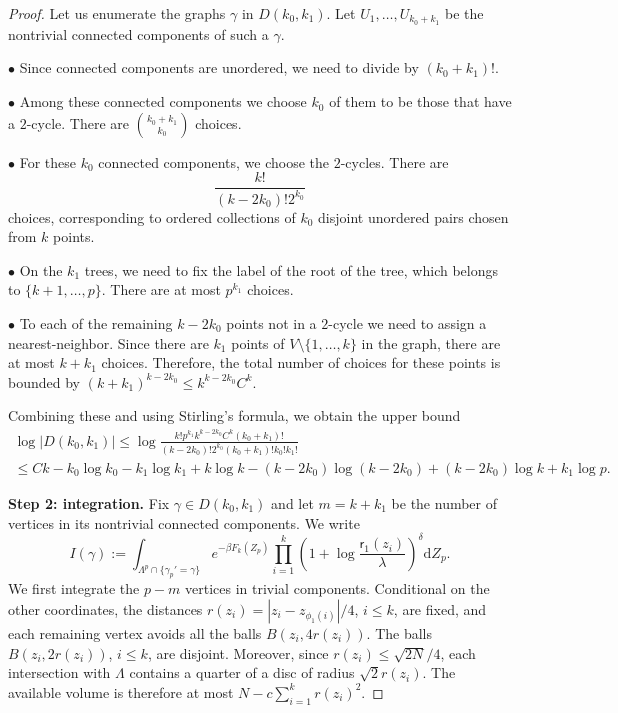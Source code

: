 \documentclass[a4paper,10pt,leqno]{amsart}
\numberwithin{equation}{section}
\newcommand{\dd}{\mathrm{d}}
\def\rr{\mathsf{r}}
\begin{document}
\begin{proof}
  Let us enumerate the graphs $\gamma$ in $D(k_0,k_1)$. Let $U_1,\ldots,U_{k_0+k_1}$ be the nontrivial connected components of such a $\gamma$.

  $\bullet $ Since connected components are unordered, we need to divide by $(k_0+k_1)!$.

  $\bullet$ Among these connected components we choose $k_0$ of them to be those that have a $2$-cycle. There are $\binom{k_0+k_1}{k_0}$ choices.

  $\bullet$ For these $k_0$ connected components, we choose the
  $2$-cycles. There are
  \begin{equation*}
    \frac{k!}{(k-2k_0)!2^{k_0}}
  \end{equation*}
  choices, corresponding to ordered collections of $k_0$ disjoint unordered pairs chosen from $k$ points.

  $\bullet$ On the $k_1$ trees, we need to fix the label of the root of the tree, which belongs to $\{k+1,\ldots,p\}$. There are at most $p^{k_1}$ choices.

  $\bullet$ To each of the remaining $k-2k_0$ points not in a $2$-cycle we need to assign a nearest-neighbor. Since there are $k_1$ points of $V\setminus \{1,\ldots,k\}$ in the graph, there are at most $k+k_1$ choices. Therefore, the total number of choices for these points is bounded by $(k+k_1)^{k-2k_0}\leq k^{k-2k_0}C^k$.

  Combining these and using Stirling's formula, we obtain the upper bound
  \begin{multline*}
    \log |D(k_0,k_1)|\le \log \frac{ k! p^{k_1} k^{k-2k_0} C^k (k_0+k_1)!}{(k-2k_0)! 2^{k_0} (k_0+k_1)! k_0! k_1!}
    \\ \leq Ck -k_0\log k_0-k_1\log k_1 +k\log k-(k-2k_0)\log (k-2k_0)+ (k-2k_0)\log k+k_1\log p.
  \end{multline*}

  \noindent
  \textbf{Step 2: integration.}
  Fix $\gamma\in D(k_0,k_1)$ and let $m=k+k_1$ be the number of vertices in its nontrivial connected components. We write
  \[
    I(\gamma):=\int_{\Lambda^p\cap\{\gamma_p'=\gamma\}}e^{-\beta F_k(Z_p)}
    \prod_{i=1}^k\left(1+\log\frac{\rr_1(z_i)}{\lambda}\right)^\delta\dd Z_p.
  \]
  We first integrate the $p-m$ vertices in trivial components. Conditional on the other coordinates, the distances $r(z_i)=|z_i-z_{\phi_1(i)}|/4$, $i\le k$, are fixed, and each remaining vertex avoids all the balls $B(z_i,4r(z_i))$. The balls $B(z_i,2r(z_i))$, $i\le k$, are disjoint. Moreover, since $r(z_i)\le\sqrt{2N}/4$, each intersection with $\Lambda$ contains a quarter of a disc of radius $\sqrt2r(z_i)$. The available volume is therefore at most $N-c\sum_{i=1}^k r(z_i)^2$.


\end{proof}
\end{document}

